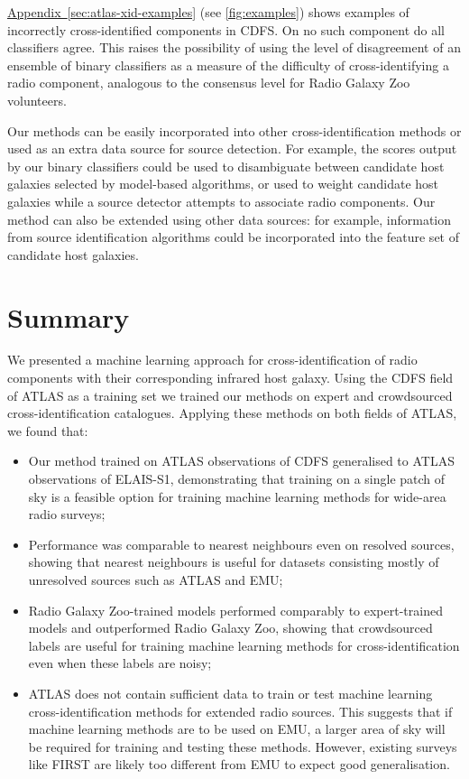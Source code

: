 \documentclass[11pt, a4paper]{book}
\newcommand{\aref}[1]{\hyperref[#1]{Appendix~\ref{#1}}}
\begin{document}
  {\aref{sec:atlas-xid-examples} (see \autoref{fig:examples}) shows examples of incorrectly cross-identified
  components in CDFS. On no such component do all classifiers agree.
  This raises the possibility of using the level of disagreement of an
  ensemble of binary classifiers as a measure of the difficulty of cross-identifying a radio component,
  analogous to the consensus level for Radio Galaxy Zoo volunteers.}

  Our methods can be easily incorporated into other cross-identification
  methods or used as an extra data source for source detection. For
  example, the scores output by our binary classifiers could be used to
  disambiguate between candidate host
  galaxies selected by model-based algorithms, or used to weight candidate
  host galaxies while a source detector attempts to associate radio
  components. Our method can also be extended using other data sources: for
  example, information from source identification algorithms could be
  incorporated into the feature set of candidate host galaxies.

\section{Summary}

  We presented a machine learning approach for cross-identification of radio
  components with their corresponding infrared host galaxy. Using the CDFS
  field of ATLAS as a training set we trained our
  methods on expert and crowdsourced cross-identification catalogues.
  Applying these methods on both fields of ATLAS, we found that:
  \begin{itemize}
    \item Our method trained on ATLAS observations of CDFS generalised to
    ATLAS observations of ELAIS-S1, demonstrating that training on a single
    patch of sky is a feasible option for training machine learning methods
    for wide-area radio surveys;
    \item Performance was comparable to nearest neighbours even on resolved
    sources, showing that nearest neighbours is useful for datasets consisting
    mostly of unresolved sources such as ATLAS and EMU;
    \item Radio Galaxy Zoo-trained models performed comparably to
    expert-trained models and outperformed Radio Galaxy Zoo, showing that
    crowdsourced labels are useful for training machine learning methods for
    cross-identification even when these labels are noisy;
    \item ATLAS does not contain sufficient data to train or test machine
    learning cross-identification methods for extended radio sources. This
    suggests that if machine learning methods are to be used on EMU, a larger
    area of sky will be required for training and testing these methods.
    However, existing surveys like FIRST are likely too different from EMU to expect
    good generalisation.
  \end{itemize}
\end{document}

